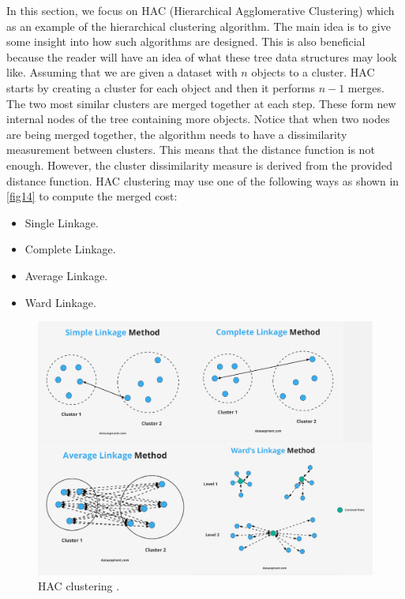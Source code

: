 \documentclass[a4paper, 12pt]{article}
\begin{document}
In this section, we focus on HAC (Hierarchical Agglomerative Clustering) which  as an example of the hierarchical clustering algorithm. The main idea is to give some insight into how such algorithms are designed. This is also beneficial because the reader will have an idea of what these tree data structures may look like. Assuming that we are given a dataset with $n$ objects to a cluster. HAC starts by creating a cluster for each object and then it performs $n - 1$ merges. The two most similar clusters are merged together at each step. These form new internal nodes of the tree containing more objects. Notice that when two nodes are being merged together, the algorithm needs to have a dissimilarity measurement between clusters. This means that the distance function is not enough. However, the cluster dissimilarity measure is derived from the provided distance function. HAC clustering may use one of the following ways as shown in \autoref{fig14} to compute the merged cost:
\begin{itemize}
    \item Single Linkage.
    \item Complete Linkage.
    \item Average Linkage.
    \item Ward Linkage.
\end{itemize}

\begin{figure}[ht]
    \centering
    \includegraphics[width=1\textwidth]{HAC Clustering.png}
    \caption{HAC clustering \citep{hierarchicalcluster2020}.}
    \label{fig14}
\end{figure}
\end{document}
